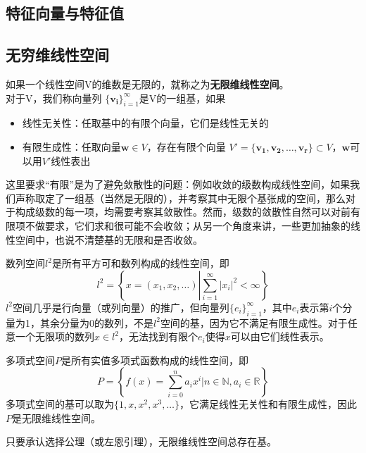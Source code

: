 \documentclass{ctexbook}
\begin{document}
\subsection{特征向量与特征值}\label{sub:eigenvector}

\subsection{无穷维线性空间}\label{sub:infinite_linear}

\begin{definition}[无限维线性空间和基]
    如果一个线性空间V的维数是无限的，就称之为\textbf{无限维线性空间}。\\
对于V，我们称向量列
$\lbrace\mathbf{v_i}\rbrace_{i=1}^{\infty}$是V的一组基，如果
\begin{itemize}
    \item 线性无关性：任取基中的有限个向量，它们是线性无关的
    \item 有限生成性：任取向量$\mathbf{w} \in V$，存在有限个向量
          $V'=\lbrace\mathbf{v_1,v_2,\dots,v_r}\rbrace\subset V $，$\mathbf{w}$可以用$V'$线性表出
\end{itemize}
\end{definition}
这里要求“有限”是为了避免敛散性的问题：例如收敛的级数构成线性空间，如果我们声称取定了一组基（当然是无限的），并考察其中无限个基张成的空间，那么对于构成级数的每一项，均需要考察其敛散性。然而，级数的敛散性自然可以对前有限项不做要求，它们求和很可能不会收敛；从另一个角度来讲，一些更加抽象的线性空间中，也说不清楚基的无限和是否收敛。

\begin{example}
    数列空间$l^2$是所有平方可和数列构成的线性空间，即
    \[l^2=\left\{x=(x_1,x_2,\ldots)\left|\sum_{i=1}^{\infty}|x_i|^2<\infty\right.\right\}\]
    $l^2$空间几乎是行向量（或列向量）的推广，但向量列$\{e_i\}_{i=1}^{\infty}$，其中$e_i$表示第$i$个分量为1，其余分量为0的数列，不是$l^2$空间的基，因为它不满足有限生成性。对于任意一个无限项的数列$x\in l^2$，无法找到有限个$e_i$使得$x$可以由它们线性表示。
\end{example}
\begin{example}
    多项式空间$P$是所有实值多项式函数构成的线性空间，即
    \[P=\left\{f(x)=\sum_{i=0}^{n}a_i x^i|n\in \mathbb{N},a_i\in \mathbb{R}\right\}\]
    多项式空间的基可以取为$\{1,x,x^2,x^3,\ldots\}$，它满足线性无关性和有限生成性，因此$P$是无限维线性空间。
\end{example}

\begin{claim}
    只要承认选择公理（或左恩引理），无限维线性空间总存在基。
\end{claim}
\end{document}
